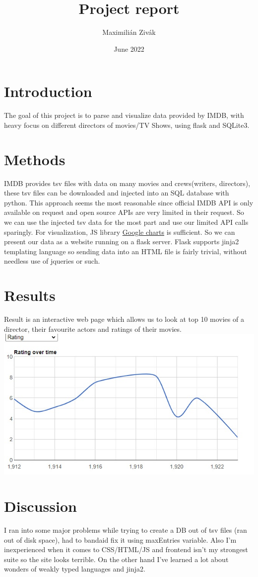 \documentclass{article}
\title{Project report}
\author{Maximilián Zivák}
\date{June 2022}
\begin{document}
\maketitle

\section{Introduction}
The goal of this project is to parse and visualize data provided by IMDB, with heavy focus on different directors of movies/TV Shows, using flask and SQLite3.
\section{Methods}
IMDB provides tsv files with data on many movies and crews(writers, directors), these tsv files can be downloaded and injected into an SQL database with python. This approach seems the most reasonable since official IMDB API is only available on request and open source APIs are very limited in their request. So we can use the injected tsv data for the most part and use our limited API calls sparingly.
\newline
For visualization, JS library \href{https://developers.google.com/chart/interactive/docs/}{Google charts} is sufficient. So we can present our data as a website running on a flask server. Flask supports jinja2 templating language so sending data into an HTML file is fairly trivial, without needless use of jqueries or such.
\section{Results}
Result is an interactive web page which allows us to look at top 10 movies of a director, their favourite actors and ratings of their movies.
\newline
\includegraphics[Chart of average ratings over time]{chart}
\section{Discussion}
I ran into some major problems while trying to create a DB out of tsv files (ran out of disk space), had to bandaid fix it using maxEntries variable. Also I'm inexperienced when it comes to CSS/HTML/JS and frontend isn't my strongest suite so the site looks terrible. On the other hand I've learned a lot about wonders of weakly typed languages and jinja2.
\end{document}
